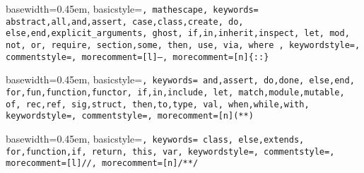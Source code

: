 { basewidth=0.45em,
  basicstyle=\small\tt,  %
  mathescape,
  keywords={
    abstract,all,and,assert,
    case,class,create,
    do,
    else,end,explicit_arguments,
    ghost,
    if,in,inherit,inspect,
    let,
    mod,
    not,
    or,
    require,
    section,some,
    then,
    use,
    via,
    where
  },
  keywordstyle=\color{blue},
  commentstyle=\color{brown},
  morecomment=[l]{--},
  morecomment=[n]{\{:}{:\}}
}

 {\lstset{language=alba}} {}







{ basewidth=0.45em,
  basicstyle=\tt\small,
  keywords={
    and,assert,
    do,done,
    else,end,
    for,fun,function,functor,
    if,in,include,
    let,
    match,module,mutable,
    of,
    rec,ref,
    sig,struct,
    then,to,type,
    val,
    when,while,with},
  keywordstyle=\color{blue},
  commentstyle=\color{brown},
  morecomment=[n]{(*}{*)}
}

 {\lstset{language=ocaml}} {}





{ basewidth=0.45em,
  basicstyle=\small\tt,
  keywords={
    class,
    else,extends,
    for,function,if,
    return,
    this,
    var},
  keywordstyle=\color{blue},
  commentstyle=\color{brown},
  morecomment=[l]{//},
  morecomment=[n]{/*}{*/}
}

 {\lstset{language=js}} {}




\newcommand{\code}[1]{{\tt\small #1}}
\def\Abold{\mathbf{A}}
\def\abold{\mathbf{a}}
\def\Bbold{\mathbf{B}}
\def\bbold{\mathbf{b}}
\def\Cbold{\mathbf{C}}
\def\Dbold{\mathbf{D}}
\def\fbold{\mathbf{f}}
\def\Pbold{\mathbf{P}}
\def\pbold{\mathbf{p}}
\def\qbold{\mathbf{q}}
\def\Tbold{\mathbf{T}}
\def\tbold{\mathbf{t}}
\def\xbold{\mathbf{x}}
\def\ybold{\mathbf{y}}
\def\zbold{\mathbf{z}}


\def\Abstract{{\cal{A}}}
\def\Any{{\cal{U}}}
\def\Boolean  {{\mathbb{B}}}
\def\Decision {{\mathbb{D}}}
\def\List   {{\mathbb{L}}}
\def\Natural{{\mathbb{N}}}
\def\Prop{{\cal{P}}}

\def\case  {\text{case}}
\def\fix   {\text{fix}}
\def\ind   {\text{ind}}
\def\Inductive    {\mathbb{I}}
\def\Constructor  {\mathbb{C}}

